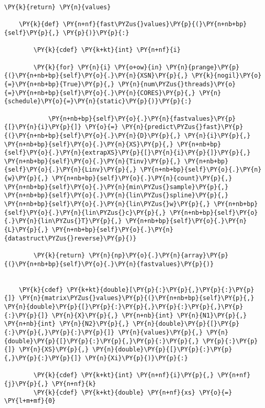 \begin{Verbatim}[commandchars=\\\{\}]
        \PY{k}{return} \PY{n}{values}
    
    \PY{k}{def} \PY{n+nf}{fast\PYZus{}values}\PY{p}{(}\PY{n+nb+bp}{self}\PY{p}{,} \PY{p}{)}\PY{p}{:}
        
        \PY{k}{cdef} \PY{k+kt}{int} \PY{n+nf}{i}
        
        \PY{k}{for} \PY{n}{i} \PY{o+ow}{in} \PY{n}{prange}\PY{p}{(}\PY{n+nb+bp}{self}\PY{o}{.}\PY{n}{XSN}\PY{p}{,} \PY{k}{nogil}\PY{o}{=}\PY{n+nb+bp}{True}\PY{p}{,} \PY{n}{num\PYZus{}threads}\PY{o}{=}\PY{n+nb+bp}{self}\PY{o}{.}\PY{n}{CORES}\PY{p}{,} \PY{n}{schedule}\PY{o}{=}\PY{n}{static}\PY{p}{)}\PY{p}{:}
            
            \PY{n+nb+bp}{self}\PY{o}{.}\PY{n}{fastvalues}\PY{p}{[}\PY{n}{i}\PY{p}{]} \PY{o}{=} \PY{n}{predict\PYZus{}fast}\PY{p}{(}\PY{n+nb+bp}{self}\PY{o}{.}\PY{n}{D}\PY{p}{,} \PY{n}{i}\PY{p}{,} \PY{n+nb+bp}{self}\PY{o}{.}\PY{n}{XS}\PY{p}{,} \PY{n+nb+bp}{self}\PY{o}{.}\PY{n}{extrapXS}\PY{p}{[}\PY{n}{i}\PY{p}{]}\PY{p}{,} \PY{n+nb+bp}{self}\PY{o}{.}\PY{n}{Tinv}\PY{p}{,} \PY{n+nb+bp}{self}\PY{o}{.}\PY{n}{Linv}\PY{p}{,} \PY{n+nb+bp}{self}\PY{o}{.}\PY{n}{w}\PY{p}{,} \PY{n+nb+bp}{self}\PY{o}{.}\PY{n}{count}\PY{p}{,} \PY{n+nb+bp}{self}\PY{o}{.}\PY{n}{min\PYZus{}sample}\PY{p}{,} \PY{n+nb+bp}{self}\PY{o}{.}\PY{n}{lin\PYZus{}spline}\PY{p}{,} \PY{n+nb+bp}{self}\PY{o}{.}\PY{n}{lin\PYZus{}w}\PY{p}{,} \PY{n+nb+bp}{self}\PY{o}{.}\PY{n}{lin\PYZus{}c}\PY{p}{,} \PY{n+nb+bp}{self}\PY{o}{.}\PY{n}{lin\PYZus{}T}\PY{p}{,} \PY{n+nb+bp}{self}\PY{o}{.}\PY{n}{L}\PY{p}{,} \PY{n+nb+bp}{self}\PY{o}{.}\PY{n}{datastruct\PYZus{}reverse}\PY{p}{)}
    
        \PY{k}{return} \PY{n}{np}\PY{o}{.}\PY{n}{array}\PY{p}{(}\PY{n+nb+bp}{self}\PY{o}{.}\PY{n}{fastvalues}\PY{p}{)}

    
    \PY{k}{cdef} \PY{k+kt}{double}[\PY{p}{:}\PY{p}{,}\PY{p}{:}\PY{p}{]} \PY{n}{matrix\PYZus{}values}\PY{p}{(}\PY{n+nb+bp}{self}\PY{p}{,}  \PY{n}{double}\PY{p}{[}\PY{p}{:}\PY{p}{,}\PY{p}{:}\PY{p}{,}\PY{p}{:}\PY{p}{]} \PY{n}{X}\PY{p}{,} \PY{n+nb}{int} \PY{n}{N1}\PY{p}{,} \PY{n+nb}{int} \PY{n}{N2}\PY{p}{,} \PY{n}{double}\PY{p}{[}\PY{p}{:}\PY{p}{,}\PY{p}{:}\PY{p}{]} \PY{n}{values}\PY{p}{,} \PY{n}{double}\PY{p}{[}\PY{p}{:}\PY{p}{,}\PY{p}{:}\PY{p}{,} \PY{p}{:}\PY{p}{]} \PY{n}{XS}\PY{p}{,} \PY{n}{double}\PY{p}{[}\PY{p}{:}\PY{p}{,}\PY{p}{:}\PY{p}{]} \PY{n}{Xi}\PY{p}{)}\PY{p}{:}

        \PY{k}{cdef} \PY{k+kt}{int} \PY{n+nf}{i}\PY{p}{,} \PY{n+nf}{j}\PY{p}{,} \PY{n+nf}{k}
        \PY{k}{cdef} \PY{k+kt}{double} \PY{n+nf}{xs} \PY{o}{=} \PY{l+m+mf}{0}


\end{Verbatim}
